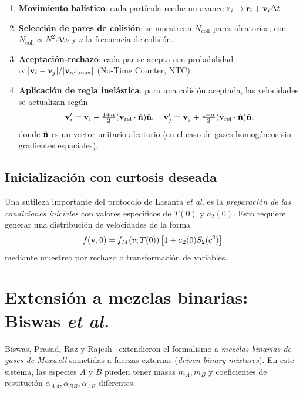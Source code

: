 \begin{enumerate}
\item \textbf{Movimiento balístico}: cada partícula recibe un avance 
$\vb{r}_i \to \vb{r}_i + \vb{v}_i \Delta t$.
\item \textbf{Selección de pares de colisión}: se muestrean $N_{\mathrm{coll}}$ 
pares aleatorios, con $N_{\mathrm{coll}} \propto N^2 \Delta t \nu$ y 
$\nu$ la frecuencia de colisión.
\item \textbf{Aceptación-rechazo}: cada par se acepta con probabilidad 
$\propto \abs{\vb{v}_i - \vb{v}_j} / \abs{\vb{v}_{\mathrm{rel,max}}}$ (No-Time 
Counter, NTC).
\item \textbf{Aplicación de regla inelástica}: para una colisión aceptada, las 
velocidades se actualizan según
\begin{equation}
    \vb{v}_i' = \vb{v}_i - \tfrac{1+\alpha}{2} (\vb{v}_{\mathrm{rel}} \cdot \hat{\vb{n}}) \hat{\vb{n}}, 
    \quad 
    \vb{v}_j' = \vb{v}_j + \tfrac{1+\alpha}{2} (\vb{v}_{\mathrm{rel}} \cdot \hat{\vb{n}}) \hat{\vb{n}},
    \label{eq:inelastic_collision}
\end{equation}
donde $\hat{\vb{n}}$ es un vector unitario aleatorio (en el caso de gases 
homogéneos sin gradientes espaciales).
\end{enumerate}

\subsection{Inicialización con curtosis deseada}

Una sutileza importante del protocolo de Lasanta \emph{et al.} es la 
\emph{preparación de las condiciones iniciales} con valores específicos de $T(0)$ 
y $a_2(0)$. Esto requiere generar una distribución de velocidades de la forma
\begin{equation}
    f(\vb{v}, 0) = f_{M}(v; T(0)) \left[1 + a_2(0) S_2(c^2)\right]
\end{equation}
%
mediante muestreo por rechazo o transformación de variables.

\section{Extensión a mezclas binarias: Biswas \emph{et al.}}

Biswas, Prasad, Raz y Rajesh~\cite{biswas2020} extendieron el formalismo a 
\emph{mezclas binarias de gases de Maxwell} sometidas a fuerzas externas 
(\emph{driven binary mixtures}). En este sistema, las especies $A$ y $B$ pueden 
tener masas $m_A, m_B$ y coeficientes de restitución $\alpha_{AA}, \alpha_{BB}, \alpha_{AB}$ 
diferentes.

